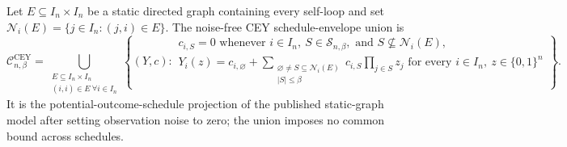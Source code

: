 Let \(E\subseteq I_n\times I_n\) be a static directed graph containing every self-loop and set \(\mathcal N_i(E)=\{j\in I_n:(j,i)\in E\}\).  The noise-free CEY schedule-envelope union is
\[
\mathcal C^{\mathrm{CEY}}_{n,\beta}
=\bigcup_{\substack{E\subseteq I_n\times I_n\\(i,i)\in E\ \forall i\in I_n}}
\left\{(Y,c):
\begin{array}{l}
c_{i,S}=0\text{ whenever }i\in I_n,\ S\in\mathcal S_{n,\beta},
\text{ and }S\nsubseteq\mathcal N_i(E),\\
Y_i(z)=c_{i,\varnothing}+\displaystyle\sum_{\substack{\varnothing\ne S\subseteq\mathcal N_i(E)\\|S|\le\beta}}c_{i,S}\prod_{j\in S}z_j
\text{ for every }i\in I_n,\ z\in\{0,1\}^n
\end{array}\right\}.
\]
It is the potential-outcome-schedule projection of the published static-graph model after setting observation noise to zero; the union imposes no common bound across schedules.